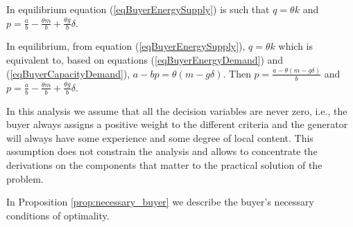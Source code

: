 \documentclass[informs]{informs3}
\begin{document}
\begin{proposition}\label{prop:prices}
In equilibrium equation (\ref{eqBuyerEnergySupply}) is such that $q = \theta k$  and $p =\frac{a}{b}-\frac{\theta m}{b}+\frac{\theta g }{b}\delta$.
\end{proposition}
%
 In equilibrium, from equation (\ref{eqBuyerEnergySupply}), $q = \theta k$ which is equivalent to, based on equations (\ref{eqBuyerEnergyDemand}) and (\ref{eqBuyerCapacityDemand}),  $a - bp = \theta(m -g \delta)$. Then $p =\frac{a -  \theta(m -g \delta)}{b}$ and 
$p =\frac{a}{b}-\frac{\theta m}{b}+\frac{\theta g }{b}\delta$. 
\Halmos
\endproof

In this analysis we assume that all the decision variables are never zero, i.e., the buyer always assigns a positive weight to the different criteria and the generator will always have some experience and some degree of local content. This assumption does not constrain the analysis and allows to concentrate the derivations on the components that matter to the practical solution of the problem.


In Proposition \ref{prop:necessary_buyer} we describe the buyer's necessary conditions of optimality. 
 
\end{document}
